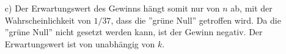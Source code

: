 \begin{enumerate}
	\item[c)] Der Erwartungswert des Gewinns hängt somit nur von $n$ ab, mit der Wahrscheinlichkeit von $1/37$, dass die ''grüne Null'' getroffen wird. Da die ''grüne Null'' nicht gesetzt werden kann, ist der Gewinn negativ. Der Erwartungswert ist von unabhängig von $k$.

\end{enumerate}
